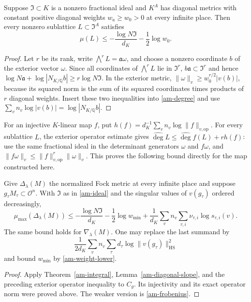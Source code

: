 \begin{lemma}\label{am-diagonal-slope}
Suppose $\mathfrak I\subset K$ is a nonzero fractional ideal and
$K^A$ has diagonal metrics with constant positive diagonal weights
$w_a\ge w_0>0$ at every infinite place. Then every nonzero sublattice
$L\subset\mathfrak I^A$ satisfies
\[
                 \mu(L)\le-\frac{\log N\mathfrak I}{d_K}
                                      -\frac12\log w_0.
\]
\end{lemma}
\begin{proof}
Let $r$ be its rank, write $\bigwedge^rL=\mathfrak a\omega$, and
choose a nonzero coordinate $b$ of the exterior vector $\omega$.
Since all coordinates of $\bigwedge^rL$ lie in $\mathfrak I^r$,
$b\mathfrak a\subset\mathfrak I^r$ and hence
$\log N\mathfrak a+\log|N_{K/\mathbb Q}b|
\ge r\log N\mathfrak I$. In the exterior metric,
$\|\omega\|_v\ge w_0^{r/2}|v(b)|$, because its squared norm is the
sum of its squared coordinates times products of $r$ diagonal weights.
Insert these two inequalities into \eqref{am-degree} and use
$\sum_vn_v\log|v(b)|=\log|N_{K/\mathbb Q}b|$.
\end{proof}

For an injective $K$-linear map $f$, put
$h(f)=d_K^{-1}\sum_v n_v\log\|f\|_{v,\mathrm{op}}$.
For every sublattice $L$, the exterior operator estimate gives
$\widehat{\deg}L\le\widehat{\deg}f(L)+r h(f)$: use the same
fractional ideal in the determinant generators $\omega$ and $f\omega$,
and $\|f\omega\|_v\le\|f\|_{v,\mathrm{op}}^r\|\omega\|_v$.
This proves the following bound directly for the map constructed here.

\begin{corollary}\label{am-slope}
Give $\Delta_\lambda(M)$ the normalized Fock metric at every infinite
place and suppose $g_\tau M_\tau\subset\mathcal O^n$.
With $\mathfrak I$ as in \eqref{am-ideal} and the singular values of
$v(g_\tau)$ ordered decreasingly,
\begin{equation}\label{am-slope-bound}
 \mu_{\max}(\Delta_\lambda(M))
 \le-\frac{\log N\mathfrak I}{d_K}-\frac12\log w_{\min}
       +\frac1{d_K}\sum_v n_v\sum_{\tau,i}
                                  \nu_{\tau,i}\log s_{\tau,i}(v).
\end{equation}
The same bound holds for $\nabla_\lambda(M)$.
One may replace the last summand by
\[
 \frac1{2d_K}\sum_vn_v\sum_\tau d_\tau
                          \log\|v(g_\tau)\|_{\mathrm{HS}}^2
\]
and bound $w_{\min}$ by \eqref{am-weight-lower}.
\end{corollary}
\begin{proof}
Apply Theorem~\ref{am-integral}, Lemma~\ref{am-diagonal-slope}, and the
preceding exterior operator inequality to $C_g$. Its injectivity and
its exact operator norm were proved above. The weaker version is
\eqref{am-frobenius}.
\end{proof}


